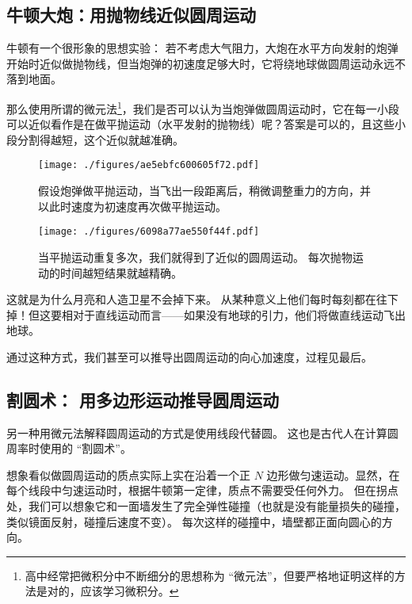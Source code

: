 

\begin{issues}
\issueDraft
\end{issues}

\subsection{牛顿大炮：用抛物线近似圆周运动}
牛顿有一个很形象的思想实验： 若不考虑大气阻力，大炮在水平方向发射的炮弹开始时近似做抛物线，但当炮弹的初速度足够大时，它将绕地球做圆周运动永远不落到地面。

那么使用所谓的微元法\footnote{高中经常把微积分中不断细分的思想称为 “微元法”，但要严格地证明这样的方法是对的，应该学习微积分。}，我们是否可以认为当炮弹做圆周运动时，它在每一小段可以近似看作是在做平抛运动（水平发射的抛物线）呢？答案是可以的，且这些小段分割得越短，这个近似就越准确。

\begin{figure}[ht]
\centering
\texttt{[image: ./figures/ae5ebfc600605f72.pdf]}
\caption{假设炮弹做平抛运动，当飞出一段距离后，稍微调整重力的方向，并以此时速度为初速度再次做平抛运动。} \label{fig_CMintr_2}
\end{figure}


\begin{figure}[ht]
\centering
\texttt{[image: ./figures/6098a77ae550f44f.pdf]}
\caption{当平抛运动重复多次，我们就得到了近似的圆周运动。 每次抛物运动的时间越短结果就越精确。} \label{fig_CMintr_3}
\end{figure}



这就是为什么月亮和人造卫星不会掉下来。 从某种意义上他们每时每刻都在往下掉！但这要相对于直线运动而言——如果没有地球的引力，他们将做直线运动飞出地球。

通过这种方式，我们甚至可以推导出圆周运动的向心加速度，过程见最后。


\subsection{割圆术： 用多边形运动推导圆周运动}
另一种用微元法解释圆周运动的方式是使用线段代替圆。 这也是古代人在计算圆周率时使用的 “割圆术”。

想象看似做圆周运动的质点实际上实在沿着一个正 $N$ 边形做匀速运动。显然，在每个线段中匀速运动时，根据牛顿第一定律，质点不需要受任何外力。 但在拐点处，我们可以想象它和一面墙发生了完全弹性碰撞（也就是没有能量损失的碰撞，类似镜面反射，碰撞后速度不变）。 每次这样的碰撞中，墙壁都正面向圆心的方向。

